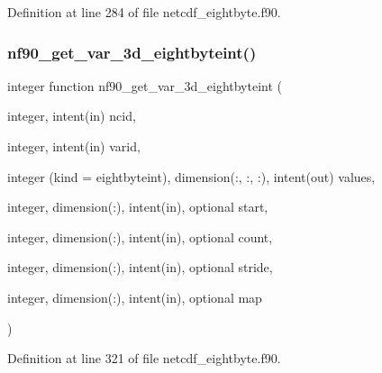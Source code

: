 Definition at line 284 of file netcdf\+\_\+eightbyte.\+f90.

\mbox{\label{netcdf__eightbyte_8f90_a8fa455e882db95833737abdb421cf413}} 
\subsubsection{\texorpdfstring{nf90\+\_\+get\+\_\+var\+\_\+3d\+\_\+eightbyteint()}{nf90\_get\_var\_3d\_eightbyteint()}}
{\footnotesize\ttfamily integer function nf90\+\_\+get\+\_\+var\+\_\+3d\+\_\+eightbyteint (\begin{DoxyParamCaption}\item[{integer, intent(in)}]{ncid,  }\item[{integer, intent(in)}]{varid,  }\item[{integer (kind = eightbyteint), dimension(\+:, \+:, \+:), intent(out)}]{values,  }\item[{integer, dimension(\+:), intent(in), optional}]{start,  }\item[{integer, dimension(\+:), intent(in), optional}]{count,  }\item[{integer, dimension(\+:), intent(in), optional}]{stride,  }\item[{integer, dimension(\+:), intent(in), optional}]{map }\end{DoxyParamCaption})}



Definition at line 321 of file netcdf\+\_\+eightbyte.\+f90.

\mbox{\label{netcdf__eightbyte_8f90_a13a8c596ce2cddbdd93d52adba8ed05f}} 
